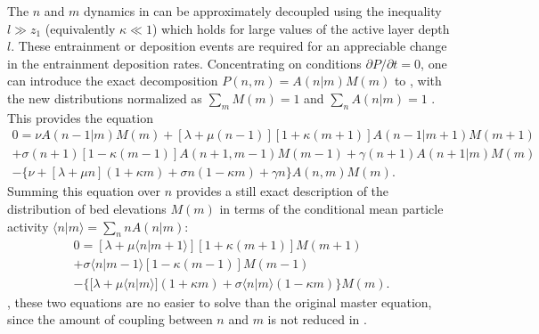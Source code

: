 The $n$ and $m$ dynamics in \DIFdelbegin {}\DIFdelend \DIFaddbegin {}\DIFaddend can be approximately decoupled using the inequality $l \gg z_1$ (equivalently $\kappa \ll 1$) which holds for large values of the active layer depth $l$.
These \DIFdelbegin {}\DIFdelend \DIFaddbegin {}\DIFaddend entrainment or deposition events are required for an appreciable change in the entrainment \DIFdelbegin {}\DIFdelend \DIFaddbegin {}\DIFaddend deposition rates.
Concentrating on \DIFdelbegin {}\DIFdelend \DIFaddbegin {}\DIFaddend conditions $\partial P/\partial t = 0$, one can introduce the exact decomposition $P(n,m) = A(n|m)M(m)$ to \DIFdelbegin {}\DIFdelend \DIFaddbegin {}\DIFaddend , with the new distributions normalized as $\sum_m M(m)=1$ and $\sum_n A(n|m)=1$ \citep[e.g.][]{Haken1978}.
This provides the \DIFdelbegin {}\DIFdelend \DIFaddbegin {}\DIFaddend equation
\begin{multline}
	0 =  
	\nu A(n-1|m)M(m) + [\lambda + \mu(n-1)][1+\kappa(m+1)]A(n-1|m+1)M(m+1)\\  
	+ \sigma(n+1)[1-\kappa(m-1)]A(n+1,m-1)M(m-1) + \gamma(n+1)A(n+1|m)M(m) \\
	- 
	\{ \nu + [\lambda+ \mu n ](1+\kappa m) +  \sigma n ( 1- \kappa m) + \gamma n \}A(n,m)M(m).
	\label{eq:decomp}
\end{multline}
Summing this equation over $n$ provides a still exact description of the distribution of bed elevations $M(m)$ in terms of the conditional mean particle activity $\langle n | m \rangle = \sum_{n}nA(n|m)$:
\begin{multline}
	0 =  [\lambda + \mu\langle n | m+1\rangle][1+\kappa(m+1)]M(m+1)
	\\+ \sigma\langle n | m-1\rangle[1-\kappa(m-1)]M(m-1) \\
	- 
	\{  [\lambda+ \mu \langle n | m\rangle ](1+\kappa m) +  \sigma  \langle n | m\rangle( 1- \kappa m) \}M(m).
	\label{eq:approxele}
\end{multline}
\DIFdelbegin {}\DIFdelend \DIFaddbegin {}\DIFaddend , these two equations are no easier to solve than the original master equation, since the amount of coupling between $n$ and $m$ is not reduced in \DIFdelbegin {}\DIFdelend \DIFaddbegin {}\DIFaddend .

